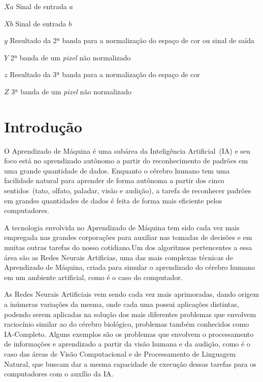 \documentclass[12pt,oneside,a4paper,chapter=TITLE,section=TITLE,sumario
		=tradicional]{abntex2}
\begin{document}
\begin{simbolos}
		  \item[$Xa$] Sinal de entrada $a$
		  \item[$Xb$] Sinal de entrada $b$
		  \item[$y$] Resultado da 2ª banda para a normalização do espaço de cor ou sinal de saída
		  \item[$Y$] 2ª banda de um \textit{pixel} não normalizado
		  \item[$z$] Resultado da 3ª banda para a normalização do espaço de cor
		  \item[$Z$] 3ª banda de um \textit{pixel} não normalizado
		\end{simbolos}
		
		\sumario
		\pagebreak		
		

		\textual
		
		\chapter{Introdução}
		\label{cap:introducao}
		
		O Aprendizado de Máquina é uma subárea da Inteligência Artificial~(IA) e seu foco está no aprendizado autônomo a partir do reconhecimento de padrões em uma grande quantidade de dados. Enquanto o cérebro humano tem uma facilidade natural para aprender de forma autônoma a partir dos cinco sentidos~(tato, olfato, paladar, visão e audição), a tarefa de reconhecer padrões em grandes quantidades de dados é feita de forma mais eficiente pelos computadores. 
		
		A tecnologia envolvida no Aprendizado de Máquina tem sido cada vez mais empregada nas grandes corporações para auxiliar nas tomadas de decisões e em muitas outras tarefas do nosso cotidiano.\hspace{0.1cm}Um dos algoritmos pertencentes a essa área são as Redes Neurais Artificias, uma das mais complexas técnicas de Aprendizado de Máquina, criada para simular o aprendizado do cérebro humano em um ambiente artificial, como é o caso do computador. 
		
		As Redes Neurais Artificiais vem sendo cada vez mais aprimoradas, dando origem a inúmeras variações da mesma, onde cada uma possui aplicações distintas, podendo serem aplicadas na solução dos mais diferentes problemas que envolvem raciocínio similar ao do cérebro biológico, problemas também conhecidos como IA-Completo. Alguns exemplos são os problemas que envolvem o processamento de informações e aprendizado a partir da visão humana e da audição, como é o caso das áreas de Visão Computacional e de Processamento de Linguagem  Natural, que buscam dar a mesma capacidade de execução dessas tarefas para os computadores com o auxílio da IA.
		
\end{document}
